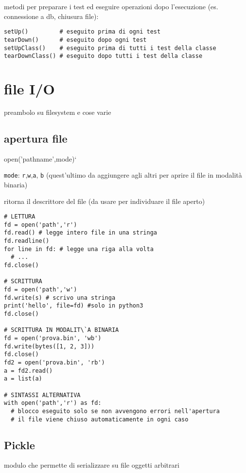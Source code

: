 metodi per preparare i test ed eseguire operazioni dopo l'esecuzione (es. connessione a db, chiusura file):

\begin{verbatim}
setUp() 		# eseguito prima di ogni test
tearDown() 		# eseguito dopo ogni test
setUpClass() 	# eseguito prima di tutti i test della classe
tearDownClass() # eseguito dopo tutti i test della classe
\end{verbatim}

\section{file I/O}

preambolo su filesystem e cose varie

\subsection{apertura file}

open('pathname',mode)`

\texttt{mode}: \texttt{r},\texttt{w},\texttt{a}, \texttt{b} (quest'ultimo da aggiungere agli altri per aprire il file in modalit\`a binaria)

ritorna il descrittore del file (da usare per individuare il file aperto)

\begin{verbatim}
# LETTURA
fd = open('path','r')
fd.read() # legge intero file in una stringa
fd.readline()
for line in fd: # legge una riga alla volta
  # ...
fd.close()

# SCRITTURA
fd = open('path','w')
fd.write(s) # scrivo una stringa
print('hello', file=fd) #solo in python3
fd.close()

# SCRITTURA IN MODALIT\`A BINARIA
fd = open('prova.bin', 'wb')
fd.write(bytes([1, 2, 3]))
fd.close()
fd2 = open('prova.bin', 'rb')
a = fd2.read()
a = list(a)

# SINTASSI ALTERNATIVA
with open('path','r') as fd:
  # blocco eseguito solo se non avvengono errori nell'apertura
  # il file viene chiuso automaticamente in ogni caso
\end{verbatim}

\subsection{Pickle}

modulo che permette di serializzare su file oggetti arbitrari

